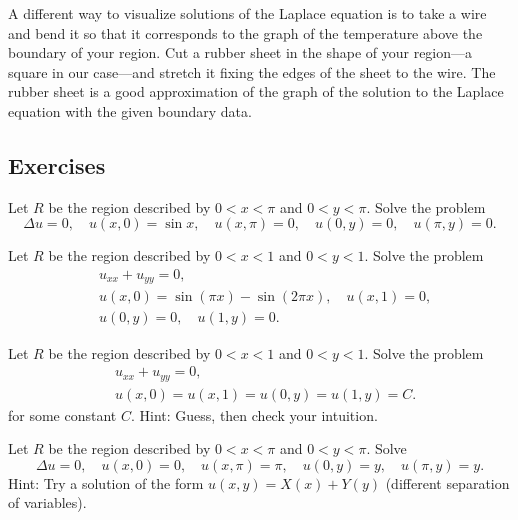 A different
way to visualize solutions of the Laplace equation is to
take a wire and bend
it so that it corresponds to the graph of the
temperature above the boundary of your region.  Cut a rubber sheet in
the shape of your region---a square in our case---and stretch it
fixing the edges of the sheet to the wire.
The rubber sheet is a good approximation of the graph of the solution to
the Laplace equation with the given boundary data.

\subsection{Exercises}

\begin{exercise}
Let $R$ be the region described by $0 < x < \pi$ and $0 < y < \pi$.
Solve the problem
\begin{equation*}
\Delta u = 0, \quad u(x,0) = \sin x, \quad u(x,\pi) = 0,
\quad u(0,y) = 0, 
\quad u(\pi,y) = 0 .
\end{equation*}
\end{exercise}

\begin{exercise}
Let $R$ be the region described by $0 < x < 1$ and $0 < y < 1$.
Solve the problem
\begin{align*}
& u_{xx} + u_{yy} = 0, \\
& u(x,0) = \sin (\pi x) - \sin (2\pi x), \quad u(x,1) = 0, \\
& u(0,y) = 0, \quad u(1,y) = 0 .
\end{align*}
\end{exercise}

\begin{exercise}
Let $R$ be the region described by $0 < x < 1$ and $0 < y < 1$.
Solve the problem
\begin{align*}
& u_{xx} + u_{yy} = 0, \\
& u(x,0) = u(x,1) = u(0,y) = u(1,y) = C .
\end{align*}
for some constant $C$.  Hint: Guess, then check your intuition.
\end{exercise}

\begin{exercise} \label{dirich:diffsepexr}
Let $R$ be the region described by $0 < x < \pi$ and $0 < y < \pi$.
Solve
\begin{equation*}
\Delta u = 0,
\quad u(x,0) = 0,
\quad u(x,\pi) = \pi,
\quad u(0,y) = y,
\quad u(\pi,y) = y .
\end{equation*}
Hint: Try a solution of the form $u(x,y) = X(x) + Y(y)$ (different separation
of variables).
\end{exercise}

